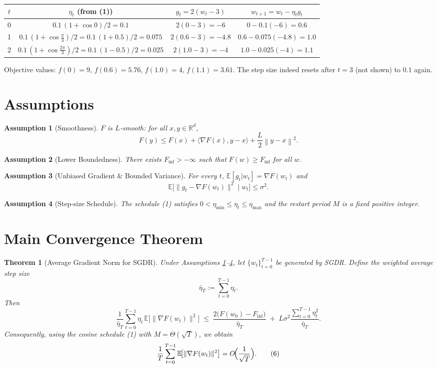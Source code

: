 \documentclass{article}
\newtheorem{theorem}{Theorem}
\newtheorem{assumption}{Assumption}
\newcommand{\E}{\mathbb{E}}
\newcommand{\R}{\mathbb{R}}
\newcommand{\norm}[1]{\left\|#1\right\|}
\newcommand{\ip}[2]{\langle #1,#2\rangle}
\begin{document}
\begin{center}
\begin{tabular}{c|c|c|c}
$t$ & $\eta_t$ (from (1)) & $g_t=2(w_t-3)$ & $w_{t+1}=w_t-\eta_t g_t$ \\ \hline
0 & $0.1\,(1+\cos0)/2=0.1$ & $2(0-3)=-6$ & $0-0.1(-6)=0.6$ \\
1 & $0.1\,(1+\cos\frac{\pi}{3})/2=0.1\,(1+0.5)/2=0.075$ & $2(0.6-3)=-4.8$ & $0.6-0.075(-4.8)=1.0$ \\
2 & $0.1\,(1+\cos\frac{2\pi}{3})/2=0.1\,(1-0.5)/2=0.025$ & $2(1.0-3)=-4$ & $1.0-0.025(-4)=1.1$
\end{tabular}
\end{center}
Objective values: $f(0)=9$, $f(0.6)=5.76$, $f(1.0)=4$, $f(1.1)=3.61$.  
The step size indeed resets after $t=3$ (not shown) to $0.1$ again.

\newpage
\section*{Assumptions}
\begin{assumption}[Smoothness] \label{ass:smooth}
$F$ is $L$‑smooth: for all $x,y\in\R^d$,
\[
F(y)\le F(x)+\ip{\nabla F(x)}{y-x}+\frac{L}{2}\norm{y-x}^2 .
\tag{3}
\]
\end{assumption}
\begin{assumption}[Lower Boundedness] \label{ass:lb}
There exists $F_{\inf}>-\infty$ such that $F(w)\ge F_{\inf}$ for all $w$.
\end{assumption}
\begin{assumption}[Unbiased Gradient & Bounded Variance] \label{ass:unbiased}
For every $t$, $\E[g_t|w_t]=\nabla F(w_t)$ and 
\[
\E\bigl[\|g_t-\nabla F(w_t)\|^2\mid w_t\bigr]\le\sigma^2 .
\tag{4}
\]
\end{assumption}
\begin{assumption}[Step‑size Schedule] \label{ass:schedule}
The schedule (1) satisfies $0<\eta_{\min}\le\eta_t\le\eta_{\max}$ and the restart period $M$ is a fixed positive integer.
\end{assumption}

\section*{Main Convergence Theorem}
\begin{theorem}[Average Gradient Norm for SGDR]\label{thm:main}
Under Assumptions \ref{ass:smooth}–\ref{ass:schedule}, let $\{w_t\}_{t=0}^{T-1}$ be generated by SGDR. Define the weighted average step size
\[
\bar\eta_T:=\sum_{t=0}^{T-1}\eta_t .
\]
Then
\[
\frac{1}{\bar\eta_T}\sum_{t=0}^{T-1}\eta_t\,\E\!\bigl[\|\nabla F(w_t)\|^2\bigr]
\;\le\;
\frac{2\bigl(F(w_0)-F_{\inf}\bigr)}{\bar\eta_T}
 \;+\; L\sigma^2\frac{\sum_{t=0}^{T-1}\eta_t^{2}}{\bar\eta_T}.
\tag{5}
\]
Consequently, using the cosine schedule (1) with $M=\Theta(\sqrt{T})$, we obtain
\[
\frac{1}{T}\sum_{t=0}^{T-1}\E\!\bigl[\|\nabla F(w_t)\|^2\bigr]
= O\!\Bigl(\frac{1}{\sqrt{T}}\Bigr).
\tag{6}
\]
\end{theorem}
\end{document}
